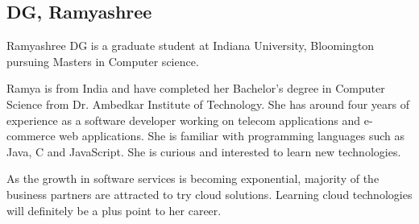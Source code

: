 \subsection{DG, Ramyashree}
Ramyashree DG is a graduate student at Indiana University, Bloomington pursuing Masters in Computer science.
 
Ramya is from India and have completed her Bachelor's degree in Computer Science from Dr. Ambedkar Institute of Technology. She has around four years of experience as a software developer working on telecom applications and e-commerce web applications. She is familiar with programming languages such as Java, C and JavaScript. She is curious and interested to learn new technologies.
 
As the growth in software services is becoming exponential, majority of the business partners are attracted to try cloud solutions. Learning cloud technologies will definitely be a plus point to her career.
